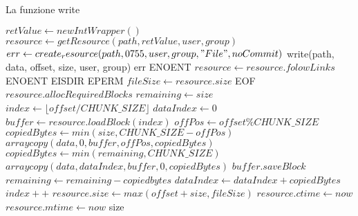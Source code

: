 \begin{algorithm}
\begin{algorithmic}[5]
\caption{La funzione write}
	\State $retValue \gets new IntWrapper()$
	\State $resource \gets getResource(path, retValue, user, group)$
		\State $err \gets create_resource(path, 0755, user, group, "File", noCommit)$
			\State \Return write(path, data, offset, size, user, group)
		\Else
			\State \Return err
		\EndIf
	\EndIf
		\State \Return ENOENT
	\EndIf
		\State $resource \gets resource.folowLinks$
	\EndIf
		\State \Return ENOENT
		\State \Return EISDIR
	\EndIf
		\State \Return EPERM
	\EndIf
	\State $fileSize \gets resource.size$
		\State \Return EOF
	\EndIf
	\State $resource.allocRequiredBlocks$
	\State $remaining \gets size$
	\State $index \gets \lfloor offset / CHUNK\_SIZE \rfloor$
	\State $dataIndex \gets 0$
		\State $buffer \gets resource.loadBlock(index)$
			\State $offPos \gets offset \% CHUNK\_SIZE$
			\State $copiedBytes \gets min(size, CHUNK\_SIZE - offPos)$
			\State $arraycopy(data, 0, buffer, offPos, copiedBytes)$
		\Else
			\State $copiedBytes \gets min(remaining, CHUNK\_SIZE)$
			\State $arraycopy(data, dataIndex, buffer, 0, copiedBytes)$
		\EndIf
		\State $buffer.saveBlock$
		\State $remaining \gets remaining-copiedbytes$
		\State $dataIndex \gets dataIndex + copiedBytes$
		\State $index++$
	\EndWhile
	\State $resource.size \gets max(offset+size, fileSize)$
	\State $resource.ctime \gets now$
	\State $resource.mtime \gets now$
	\State \Return size
\EndFunction
\end{algorithmic}
\end{algorithm}

